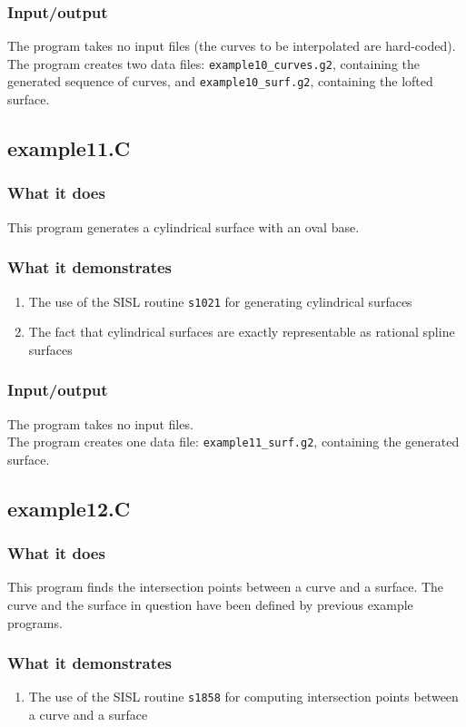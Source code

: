 \subsubsection{Input/output}
The program takes no input files (the curves to be interpolated are hard-coded).\\
The program creates two data files: \verb/example10_curves.g2/, containing the generated
sequence of curves, and \verb/example10_surf.g2/, containing the lofted surface.

\subsection{example11.C}

\subsubsection{What it does}
This program generates a cylindrical surface with an oval base.
\subsubsection{What it demonstrates}
\begin{enumerate}
\item The use of the SISL routine \verb/s1021/ for generating cylindrical surfaces
\item The fact that cylindrical surfaces are exactly representable as rational spline surfaces
\end{enumerate}
\subsubsection{Input/output}
The program takes no input files.\\
The program creates one data file: \verb/example11_surf.g2/, containing the generated surface.

\subsection{example12.C}

\subsubsection{What it does}
This program finds the intersection points between a curve and a surface.  The curve and the 
surface in question have been defined by previous example programs.
\subsubsection{What it demonstrates}
\begin{enumerate}
\item The use of the SISL routine \verb/s1858/ for computing intersection points between a 
curve and a surface
\end{enumerate}
